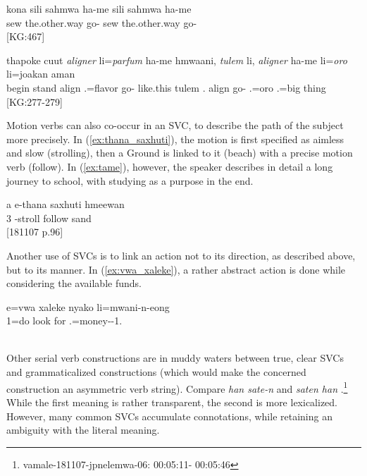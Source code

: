 \ea \label{ex:hame_kito}
\gll kona sili sahmwa ha-me sili sahmwa ha-me\\ 
  sew the.other.way go- sew the.other.way go- \\ 
\glt {} {[KG:467]}
\z

\ea \label{ex:oro}
\gll thapoke cuut \textit{aligner} li=\textit{parfum} ha-me hmwaani, \textit{tulem} li, \textit{aligner} ha-me li=\textit{oro} li=joakan aman\\ 
 begin stand align .=flavor go- like.this tulem . align go- .=oro .=big thing\\ 
\glt {} {[KG:277-279]}
\z

%
%
%
%
%
%

Motion verbs can also co-occur in an SVC, to describe the path of the subject more precisely. In (\ref{ex:thana_saxhuti}), the motion is first specified as aimless and slow (strolling), then a Ground is linked to it (beach) with a precise motion verb (follow). In (\ref{ex:tame}), however, the speaker describes in detail a long journey to school, with studying as a purpose in the end.  

\ea \label{ex:thana_saxhuti}
\gll a e-thana saxhuti hmeewan\\ 
 3 -stroll follow sand\\ 
\glt {} {[181107 p.96]}
\z

Another use of SVCs is to link an action not to its direction, as described above, but to its manner. In (\ref{ex:vwa_xaleke}), a rather abstract action is done while considering the available funds.

\ea
\label{ex:vwa_xaleke}
\gll e=vwa xaleke nyako li=mwani-n-eong\\ 
 1=do look for .=money--1.\\ 
\glt {}\\
\z

Other serial verb constructions are in muddy waters between true, clear SVCs and grammaticalized constructions (which would make the concerned construction an asymmetric verb string). Compare \textit{han sate-n}   and \textit{saten han} .\footnote{vamale-181107-jpnelemwa-06: 00:05:11- 00:05:46} While the first meaning is rather transparent, the second is more lexicalized. However, many common SVCs accumulate connotations, while retaining an ambiguity with the literal meaning.

